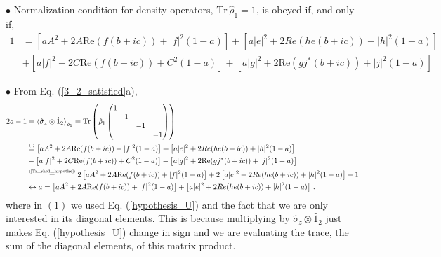 \documentclass[11pt]{article}
\numberwithin{equation}{section} %
\numberwithin{figure}{section} %
\newcommand\numeq[1] %
  {\stackrel{\scriptscriptstyle(\mkern-1.5mu#1\mkern-1.5mu)}{=}}
\begin{document}
\begin{appendices}
\noindent $\bullet$ Normalization condition for density operators, $\textrm{Tr}\,\hat{\rho}_1 = 1$, is obeyed if, and only if,
\begin{equation} \label{Tr_rho1_hypothe}
\begin{split}
1
&=\left[aA^2+2A\textrm{Re}(f(b+ic))+|f|^2(1-a)\right] + \left[a|e|^2+2Re(he(b+ic))+|h|^2(1-a)\right]\\
&	+  \left[a|f|^2+2C\textrm{Re}(f(b+ic))+C^2(1-a)\right] +\left[a|g|^2+2\textrm{Re}(gj^*(b+ic))+|j|^2(1-a)\right]
\end{split}
\end{equation}

\noindent $\bullet$ From Eq. (\ref{3_2_satisfied}a),
\begin{equation}  \label{2a-1_hypothesis_1}
\begin{split}
2a-1
&	=\braket{\hat{\sigma}_z\otimes\hat{1}_2}_{\hat{\rho}_1} =   \textrm{Tr}\left(\hat{\rho}_1\begin{pmatrix}1&&&\\ &1&&\\ &&-1&\\ &&&-1\end{pmatrix} \right)\\
&	\numeq{1} \left[aA^2+2A\textrm{Re}(f(b+ic))+|f|^2(1-a)\right] + \left[a|e|^2+2Re(he(b+ic))+|h|^2(1-a)\right]\\
&	-  \left[a|f|^2+2C\textrm{Re}(f(b+ic))+C^2(1-a)\right] -\left[a|g|^2+2\textrm{Re}(gj^*(b+ic))+|j|^2(1-a)\right]\\
&	\numeq{\textrm{\ref{Tr_rho1_hypothe}}} 2\left[aA^2+2A\textrm{Re}(f(b+ic))+|f|^2(1-a)\right] + 2\left[a|e|^2+2Re(he(b+ic))+|h|^2(1-a)\right] -1\\
&	\leftrightarrow a= \left[aA^2+2A\textrm{Re}(f(b+ic))+|f|^2(1-a)\right] + \left[a|e|^2+2Re(he(b+ic))+|h|^2(1-a)\right]\,.
\end{split}
\end{equation}
where in $(1)$ we used Eq. (\ref{hypothesis_U}) and the fact that we are only interested in its diagonal elements. This is because multiplying by $\hat{\sigma}_z\otimes\hat{1}_2$ just makes Eq. (\ref{hypothesis_U}) change in sign and we are evaluating the trace, the sum of the diagonal elements, of this matrix product.\\


\end{appendices}
\end{document}
